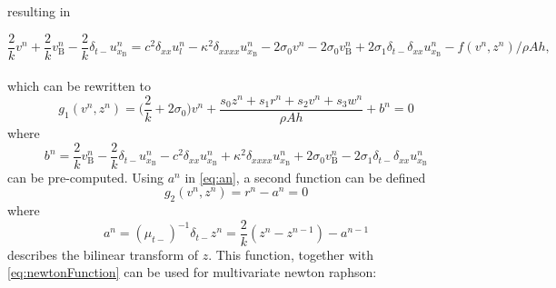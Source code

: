 \documentclass{article}
\begin{document}
\noindent resulting in 

\begin{equation}
\label{eq:stiffStringFDS}
\frac{2}{k}v^n + \frac{2}{k}v_\text{B}^n - \frac{2}{k}\delta_{t-}u_{x_\text{B}}^n =c^2 \delta_{xx} u_l^n -\kappa^2\delta_{xxxx} u_{x_\text{B}}^n - 2\sigma_0v^n - 2\sigma_0v_\text{B}^n
+ 2\sigma_1\delta_{t-}\delta_{xx}u_{x_\text{B}}^n - f(v^n, z^n)/\rho Ah,
\end{equation}
\\
which can be rewritten to
\begin{equation}\label{eq:newtonFunction}
\boxed{g_1(v^n, z^n) = \Big(\frac{2}{k} + 2\sigma_0\Big)v^n + \frac{s_0z^n+s_1r^n+s_2v^n+s_3w^n}{\rho A h} + b^n = 0} \end{equation}
where
\begin{equation}
    b^n = \frac{2}{k}v_\text{B}^n-\frac{2}{k}\delta_{t-}u_{x_\text{B}}^n - c^2 \delta_{xx} u_{x_\text{B}}^n +\kappa^2\delta_{xxxx} u_{x_\text{B}}^n + 2\sigma_0v_\text{B}^n
- 2\sigma_1\delta_{t-}\delta_{xx}u_{x_\text{B}}^n
\end{equation}
can be pre-computed. Using $a^n$ in \eqref{eq:an}, a second function can be defined
\begin{equation}
   \boxed{g_2(v^n,z^n) = r^n -  a^n = 0}
\end{equation}
where
\begin{equation}\label{eq:an}
    a^n = (\mu_{t-})^{-1}\delta_{t-}z^n = \frac{2}{k}(z^n-z^{n-1})-a^{n-1}
\end{equation}
describes the bilinear transform of $z$. 
This function, together with \eqref{eq:newtonFunction} can be used for multivariate newton raphson:
\end{document}
